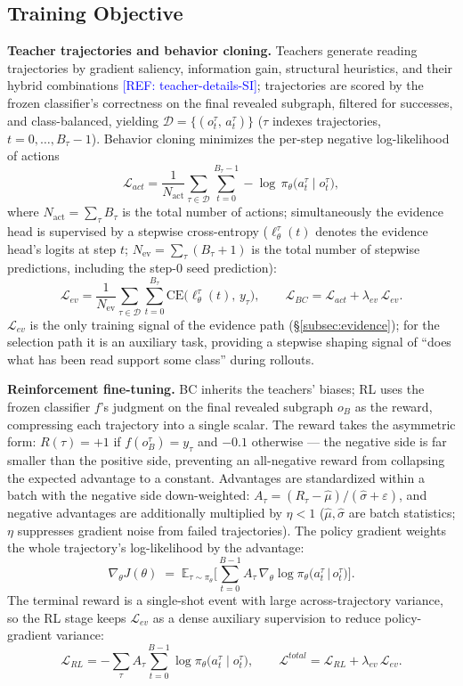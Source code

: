\documentclass{article}
\newcommand{\refadd}[1]{\textcolor{blue}{[REF: #1]}}
\begin{document}
\subsection{Training Objective}
\label{subsec:objective}

\textbf{Teacher trajectories and behavior cloning.} Teachers generate reading trajectories by gradient saliency, information gain, structural heuristics, and their hybrid combinations \refadd{teacher-details-SI}; trajectories are scored by the frozen classifier's correctness on the final revealed subgraph, filtered for successes, and class-balanced, yielding $\mathcal{D}=\big\{(o_t^{\tau},\,a_t^{\tau})\big\}$ ($\tau$ indexes trajectories, $t=0,\dots,B_\tau{-}1$). Behavior cloning minimizes the per-step negative log-likelihood of actions
\[
\mathcal{L}_{act}=\frac{1}{N_{\mathrm{act}}}\sum_{\tau\in\mathcal{D}}\sum_{t=0}^{B_\tau-1}-\log\,\pi_\theta\big(a_t^{\tau}\mid o_t^{\tau}\big),
\]
where $N_{\mathrm{act}}=\sum_\tau B_\tau$ is the total number of actions; simultaneously the evidence head is supervised by a stepwise cross-entropy ($\ell_\theta^{\tau}(t)$ denotes the evidence head's logits at step $t$; $N_{\mathrm{ev}}=\sum_\tau(B_\tau+1)$ is the total number of stepwise predictions, including the step-0 seed prediction):
\[
\mathcal{L}_{ev}=\frac{1}{N_{\mathrm{ev}}}\sum_{\tau\in\mathcal{D}}\sum_{t=0}^{B_\tau}\mathrm{CE}\big(\ell_\theta^{\tau}(t),\,y_\tau\big),
\qquad
\mathcal{L}_{BC}=\mathcal{L}_{act}+\lambda_{ev}\,\mathcal{L}_{ev}.
\]
$\mathcal L_{ev}$ is the only training signal of the evidence path (\S\ref{subsec:evidence}); for the selection path it is an auxiliary task, providing a stepwise shaping signal of ``does what has been read support some class'' during rollouts.

\textbf{Reinforcement fine-tuning.} BC inherits the teachers' biases; RL uses the frozen classifier $f$'s judgment on the final revealed subgraph $o_B$ as the reward, compressing each trajectory into a single scalar. The reward takes the asymmetric form: $R(\tau)=+1$ if $f(o_B^{\tau})=y_\tau$ and $-0.1$ otherwise --- the negative side is far smaller than the positive side, preventing an all-negative reward from collapsing the expected advantage to a constant. Advantages are standardized within a batch with the negative side down-weighted: $A_\tau=(R_\tau-\hat\mu)/(\hat\sigma+\varepsilon)$, and negative advantages are additionally multiplied by $\eta<1$ ($\hat\mu,\hat\sigma$ are batch statistics; $\eta$ suppresses gradient noise from failed trajectories). The policy gradient weights the whole trajectory's log-likelihood by the advantage:
\[
\nabla_\theta J(\theta)\;=\;\mathbb{E}_{\tau\sim\pi_\theta}\Big[\sum_{t=0}^{B-1}A_\tau\,\nabla_\theta\log\pi_\theta\big(a_t^{\tau}\,\big|\,o_t^{\tau}\big)\Big].
\]
The terminal reward is a single-shot event with large across-trajectory variance, so the RL stage keeps $\mathcal L_{ev}$ as a dense auxiliary supervision to reduce policy-gradient variance:
\[
\mathcal{L}_{RL}= -\sum_{\tau}A_\tau\sum_{t=0}^{B-1}\log\pi_\theta\big(a_t^{\tau}\mid o_t^{\tau}\big),
\qquad
\mathcal{L}^{total}=\mathcal{L}_{RL}+\lambda_{ev}\,\mathcal{L}_{ev}.
\]
\end{document}
